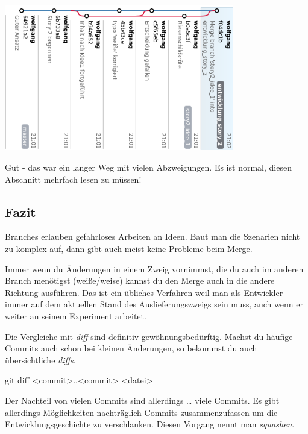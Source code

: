 \documentclass[
  letterpaper,
  DIV=11]{scrreprt}
\newenvironment{Shaded}{\begin{snugshade}}{\end{snugshade}}
\newcommand{\FunctionTok}[1]{\textcolor[rgb]{0.28,0.35,0.67}{#1}}
\newcommand{\NormalTok}[1]{\textcolor[rgb]{0.00,0.23,0.31}{#1}}
\newcommand{\OperatorTok}[1]{\textcolor[rgb]{0.37,0.37,0.37}{#1}}
\begin{document}
\includegraphics[width=10cm,height=\textheight,keepaspectratio]{bilder/bash/buch_2.png}

Gut - das war ein langer Weg mit vielen Abzweigungen. Es ist normal,
diesen Abschnitt mehrfach lesen zu müssen!

\subsection{Fazit}\label{fazit}

Branches erlauben gefahrloses Arbeiten an Ideen. Baut man die Szenarien
nicht zu komplex auf, dann gibt auch meist keine Probleme beim Merge.

Immer wenn du Änderungen in einem Zweig vornimmst, die du auch im
anderen Branch menötigst (weiße/weise) kannst du den Merge auch in die
andere Richtung ausführen. Das ist ein übliches Verfahren weil man als
Entwickler immer auf dem aktuellen Stand des Auslieferungszweigs sein
muss, auch wenn er weiter an seinem Experiment arbeitet.

Die Vergleiche mit \emph{diff} sind definitiv gewöhnungsbedürftig.
Machst du häufige Commits auch schon bei kleinen Änderungen, so bekommst
du auch übersichtliche \emph{diffs}.

\begin{Shaded}
\begin{Highlighting}[]
\FunctionTok{git}\NormalTok{ diff }\OperatorTok{\textless{}}\NormalTok{commit}\OperatorTok{\textgreater{}}\NormalTok{..}\OperatorTok{\textless{}}\NormalTok{commit}\OperatorTok{\textgreater{}} \OperatorTok{\textless{}}\NormalTok{datei}\OperatorTok{\textgreater{}}
\end{Highlighting}
\end{Shaded}

Der Nachteil von vielen Commits sind allerdings \ldots{} viele Commits.
Es gibt allerdings Möglichkeiten nachträglich Commits zusammenzufassen
um die Entwicklungsgeschichte zu verschlanken. Diesen Vorgang nennt man
\emph{squashen}.
\end{document}
